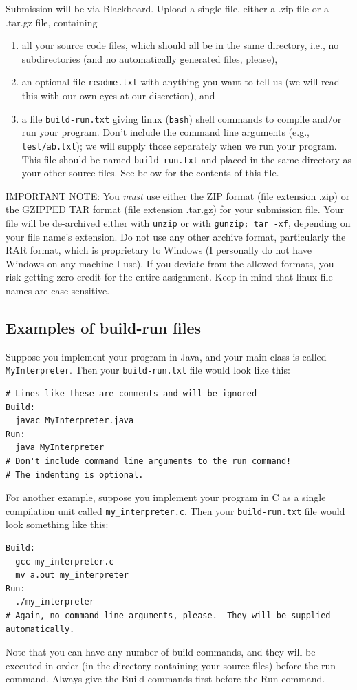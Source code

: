\documentclass[11pt]{article}
\renewcommand{\t}[1]{\texttt{#1}}
\theoremstyle{definition}
\begin{document}
Submission will be via Blackboard.  Upload a single file, either a .zip file or a .tar.gz file, containing
\begin{enumerate}
\item
all your source code files, which should all be in the same directory, i.e., no subdirectories (and no automatically generated files, please),
\item
an optional file \t{readme.txt} with anything you want to tell us (we will read this with our own eyes at our discretion), and
\item
a file \t{build-run.txt} giving linux (\t{bash}) shell commands to compile and/or run your program.  Don't include the command line arguments (e.g., \t{test/ab.txt}); we will supply those separately when we run your program.  This file should be named \t{build-run.txt} and placed in the same directory as your other source files.  See below for the contents of this file.
\end{enumerate}

IMPORTANT NOTE:  You \emph{must} use either the ZIP format (file extension .zip) or the GZIPPED TAR format (file extension .tar.gz) for your submission file.  Your file will be de-archived either with \t{unzip} or with \t{gunzip; tar -xf}, depending on your file name's extension.  Do not use any other archive format, particularly the RAR format, which is proprietary to Windows (I personally do not have Windows on any machine I use).  If you deviate from the allowed formats, you risk getting zero credit for the entire assignment.  Keep in mind that linux file names are case-sensitive.

\subsection{Examples of build-run files}

Suppose you implement your program in Java, and your main class is called \t{MyInterpreter}.  Then your \t{build-run.txt} file would look like this:
\begin{verbatim}
# Lines like these are comments and will be ignored
Build:
  javac MyInterpreter.java
Run:
  java MyInterpreter
# Don't include command line arguments to the run command!
# The indenting is optional.
\end{verbatim}
For another example, suppose you implement your program in C as a single compilation unit called \t{my\_interpreter.c}.  Then your \t{build-run.txt} file would look something like this:
\begin{verbatim}
Build:
  gcc my_interpreter.c
  mv a.out my_interpreter
Run:
  ./my_interpreter
# Again, no command line arguments, please.  They will be supplied automatically.
\end{verbatim}
Note that you can have any number of build commands, and they will be executed in order (in the directory containing your source files) before the run command.  Always give the Build commands first before the Run command.
\end{document}
